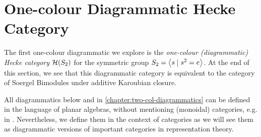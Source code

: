 \section{One-colour Diagrammatic Hecke Category}
\label{sec:3.1}

The first one-colour diagrammatic we explore is the \textit{one-colour (diagrammatic) Hecke category} $\mathcal{H}(S_2)$ for the symmetric group $S_2 = {\left\langle s \mathrel{|} s^2 = e \right\rangle}$. At the end of this section, we see that this diagrammatic category is equivalent to the category of Soergel Bimodules under additive Karoubian closure.

\begin{remark}
    All diagrammatics below and in \autoref{chapter:two-col-diagrammatics} can be defined in the language of planar algebras, without mentioning (monoidal) categories, e.g. in \cite{jones-planar-algebra}. Nevertheless, we define them in the context of categories as we will see them as diagrammatic versions of important categories in representation theory.
\end{remark}


